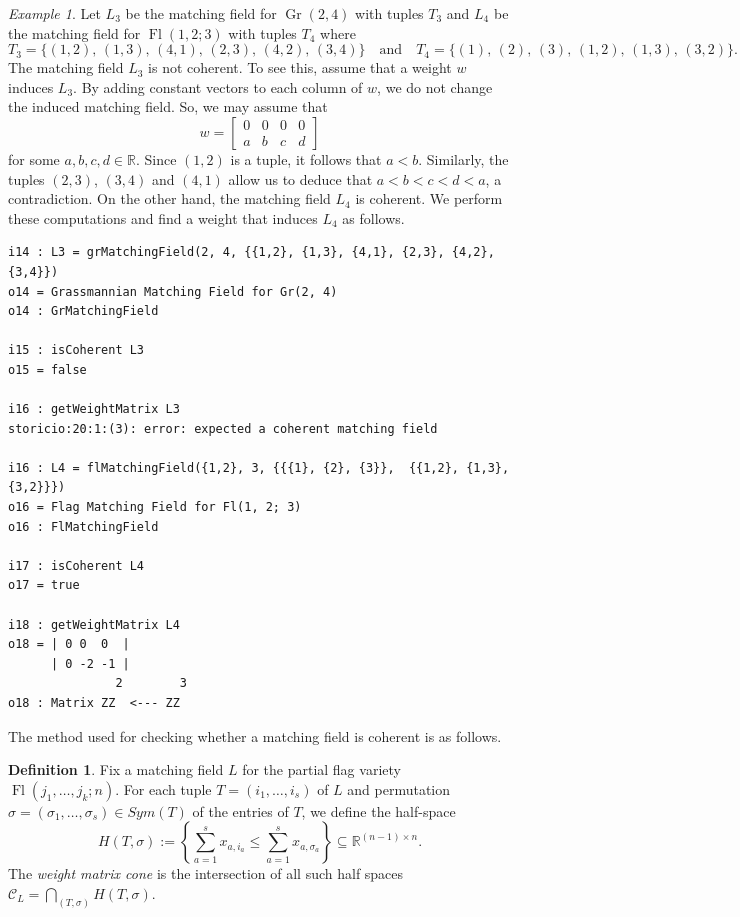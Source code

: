 \documentclass[11pt]{article}
\newcommand{\RR}{\mathbb R}
\newcommand{\MC}{\mathcal C}
\DeclareMathOperator{\Fl}{Fl}
\DeclareMathOperator{\Gr}{Gr}
\theoremstyle{plain}
\theoremstyle{definition}
\newtheorem{definition}[theorem]{Definition}
\theoremstyle{remark}
\newtheorem{example}[theorem]{Example}
\begin{document}
\begin{example}
    Let $L_3$ be the matching field for $\Gr(2,4)$ with tuples $T_3$ and $L_4$ be the matching field for $\Fl(1,2;3)$ with tuples $T_4$ where
    \[
    T_3 = \{
    (1,2),\, (1,3),\, (4,1),\, (2,3),\, (4,2),\, (3,4)\}
    \quad \text{and} \quad
    T_4 = \{
    (1),\, (2),\, (3),\,
    (1,2),\, (1,3),\, (3,2)
    \}.
    \]
    The matching field $L_3$ is not coherent. To see this, assume that a weight $w$ induces $L_3$. By adding constant vectors to each column of $w$, we do not change the induced matching field. So, we may assume that
    \[
    w = 
    \begin{bmatrix}
    0 & 0 & 0 & 0 \\
    a & b & c & d
    \end{bmatrix}
    \]
    for some $a,b,c,d \in \RR$. Since $(1,2)$ is a tuple, it follows that $a < b$. Similarly, the tuples $(2,3)$, $(3,4)$ and $(4,1)$ allow us to deduce that $a < b < c < d < a$, a contradiction. On the other hand, the matching field $L_4$ is coherent. We perform these computations and find a weight that induces $L_4$ as follows.
\begin{lstlisting}[caption = {Matching fields from tuples}]
i14 : L3 = grMatchingField(2, 4, {{1,2}, {1,3}, {4,1}, {2,3}, {4,2}, {3,4}})
o14 = Grassmannian Matching Field for Gr(2, 4)
o14 : GrMatchingField

i15 : isCoherent L3
o15 = false

i16 : getWeightMatrix L3
storicio:20:1:(3): error: expected a coherent matching field

i16 : L4 = flMatchingField({1,2}, 3, {{{1}, {2}, {3}},  {{1,2}, {1,3}, {3,2}}})
o16 = Flag Matching Field for Fl(1, 2; 3)
o16 : FlMatchingField

i17 : isCoherent L4
o17 = true

i18 : getWeightMatrix L4
o18 = | 0 0  0  |
      | 0 -2 -1 |
               2        3
o18 : Matrix ZZ  <--- ZZ
\end{lstlisting}


\end{example}

The method used for checking whether a matching field is coherent is as follows.

\begin{definition} \label{def: weight matrix cone}
Fix a matching field $L$ for the partial flag variety $\Fl(j_1, \dots, j_k; n)$. For each tuple $T = (i_1, \dots, i_s)$ of $L$ and permutation $\sigma = (\sigma_1, \dots, \sigma_s) \in Sym(T)$ of the entries of $T$, we define the half-space
\[
H(T, \sigma) := \left\{\sum_{a = 1}^s x_{a, i_a} \le \sum_{a = 1}^s x_{a, \sigma_a}  \right\}
\subseteq \RR^{(n-1) \times n}.
\]
The \textit{weight matrix cone} is the intersection of all such half spaces $\MC_L = \bigcap_{(T, \sigma)} H(T, \sigma)$.
\end{definition}
\end{document}
